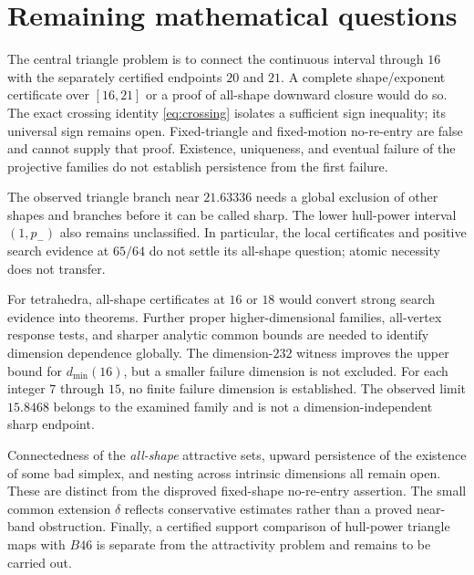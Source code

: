 \documentclass[11pt]{article}
\theoremstyle{definition}
\newcommand{\pn}{p_{-}}
\begin{document}
\section{Remaining mathematical questions}
The central triangle problem is to connect the continuous interval through
$16$ with the separately certified endpoints $20$ and $21$. A complete
shape/exponent certificate over $[16,21]$ or a proof of all-shape downward
closure would do so. The exact crossing identity \eqref{eq:crossing}
isolates a sufficient sign inequality; its universal sign remains open.
Fixed-triangle and fixed-motion no-re-entry are false and cannot supply
that proof. Existence, uniqueness, and eventual failure of the projective
families do not establish persistence from the first failure.

The observed triangle branch near $21.63336$ needs a global exclusion of
other shapes and branches before it can be called sharp. The lower
hull-power interval $(1,\pn)$ also remains unclassified. In particular,
the local certificates and positive search evidence at $65/64$ do not
settle its all-shape question; atomic necessity does not transfer.

For tetrahedra, all-shape certificates at $16$ or $18$ would convert strong
search evidence into theorems. Further proper higher-dimensional families,
all-vertex response tests, and sharper analytic common bounds are needed
to identify dimension dependence globally. The dimension-$232$ witness
improves the upper bound for $d_{\min}(16)$, but a smaller failure dimension
is not excluded. For each integer $7$ through $15$, no finite failure
dimension is established. The observed limit $15.8468$ belongs to the
examined family and is not a dimension-independent sharp endpoint.

Connectedness of the \emph{all-shape} attractive sets, upward persistence
of the existence of some bad simplex, and nesting across intrinsic
dimensions all remain open. These are distinct from the disproved
fixed-shape no-re-entry assertion.
The small common extension $\delta$ reflects conservative estimates rather
than a proved near-band obstruction. Finally, a certified support comparison
of hull-power triangle maps with $B46$ is separate from the attractivity
problem and remains to be carried out.

\appendix
\end{document}
